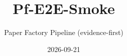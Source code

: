 \documentclass[11pt]{article}
\title{Pf-E2E-Smoke}
\author{Paper Factory Pipeline (evidence-first)}
\date{2026-09-21}
\begin{document}
\maketitle
\begin{abstract}

\end{abstract}







\end{document}
